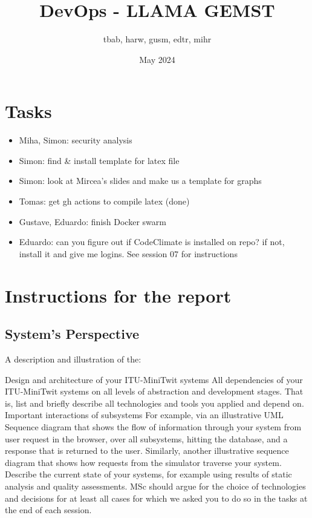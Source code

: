 \documentclass{article}
\title{DevOps - LLAMA GEMST}
\author{tbab, harw, gusm, edtr, mihr}
\date{May 2024}
\begin{document}
\maketitle

\section{Tasks}

\begin{itemize}
  \item Miha, Simon: security analysis
  \item Simon: find \& install template for latex file
  \item Simon: look at Mircea's slides and make us a template for graphs
  \item Tomas: get gh actions to compile latex (done)
  \item Gustave, Eduardo: finish Docker swarm
  \item Eduardo: can you figure out if CodeClimate is installed on repo? if not, install it and give me logins. See session 07 for instructions
\end{itemize}

\section{Instructions for the report}
\subsection{System's Perspective}

A description and illustration of the:

Design and architecture of your ITU-MiniTwit systems
All dependencies of your ITU-MiniTwit systems on all levels of abstraction and development stages. That is, list and briefly describe all technologies and tools you applied and depend on.
Important interactions of subsystems
For example, via an illustrative UML Sequence diagram that shows the flow of information through your system from user request in the browser, over all subsystems, hitting the database, and a response that is returned to the user.
Similarly, another illustrative sequence diagram that shows how requests from the simulator traverse your system.
Describe the current state of your systems, for example using results of static analysis and quality assessments.
MSc should argue for the choice of technologies and decisions for at least all cases for which we asked you to do so in the tasks at the end of each session.
\end{document}
